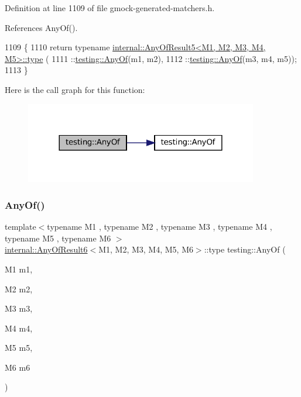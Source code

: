 Definition at line 1109 of file gmock-\/generated-\/matchers.\+h.



References Any\+Of().


\begin{DoxyCode}
1109                                          \{
1110   \textcolor{keywordflow}{return} \textcolor{keyword}{typename} \hyperlink{namespacegenerate__debs_a50bc9a7ecac9584553e089a448bcde58}{internal::AnyOfResult5<M1, M2, M3, M4, M5>::type}
      (
1111       ::\hyperlink{namespacetesting_a81cfefd9f75cdce827d5bc873cf73aac}{testing::AnyOf}(m1, m2),
1112       ::\hyperlink{namespacetesting_a81cfefd9f75cdce827d5bc873cf73aac}{testing::AnyOf}(m3, m4, m5));
1113 \}
\end{DoxyCode}
Here is the call graph for this function\+:
\nopagebreak
\begin{figure}[H]
\begin{center}
\leavevmode
\includegraphics[width=288pt]{namespacetesting_a049ea436e52c242adc44b2b42dc03e50_cgraph}
\end{center}
\end{figure}
\mbox{\label{namespacetesting_a747189264a49a426004366371f1a2575}} 
\subsubsection{\texorpdfstring{Any\+Of()}{AnyOf()}\hspace{0.1cm}{\footnotesize\ttfamily [5/9]}}
{\footnotesize\ttfamily template$<$typename M1 , typename M2 , typename M3 , typename M4 , typename M5 , typename M6 $>$ \\
\hyperlink{structtesting_1_1internal_1_1AnyOfResult6}{internal\+::\+Any\+Of\+Result6}$<$M1, M2, M3, M4, M5, M6$>$\+::type testing\+::\+Any\+Of (\begin{DoxyParamCaption}\item[{M1}]{m1,  }\item[{M2}]{m2,  }\item[{M3}]{m3,  }\item[{M4}]{m4,  }\item[{M5}]{m5,  }\item[{M6}]{m6 }\end{DoxyParamCaption})\hspace{0.3cm}{\ttfamily [inline]}}




